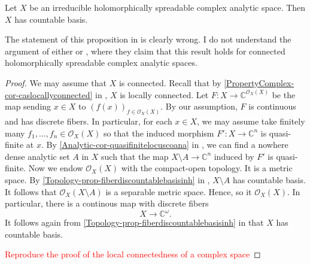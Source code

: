 \begin{proposition}
    Let $X$ be an irreducible holomorphically spreadable complex analytic space. Then $X$ has countable basis.
\end{proposition}
The statement of this proposition in \cite[Proposition~0.37]{Fis76} is clearly wrong. I do not understand the argument of either \cite{Jur59} or \cite{Gra55}, where they claim that this result holds for connected holomorphically spreadable complex analytic spaces.
\begin{proof}
    We may assume that $X$ is connected. Recall that by \cref{PropertyComplex-cor-caslocallyconnected} in , $X$ is locally connected.
    Let $F:X\rightarrow \mathbb{C}^{\mathcal{O}_X(X)}$ be the map sending $x\in X$ to $(f(x))_{f\in \mathcal{O}_X(X)}$. By our assumption, $F$ is continuous and has discrete fibers.     
    In particular, for each $x\in X$, we may assume take finitely many $f_1,\ldots,f_n\in \mathcal{O}_X(X)$ so that the induced morphism $F':X\rightarrow \mathbb{C}^n$ is quasi-finite at $x$. By \cref{Analytic-cor-quasifinitelocuscoana} in , we can find a nowhere dense analytic set $A$ in $X$ such that the map $X\setminus A\rightarrow \mathbb{C}^n$ induced by $F'$ is quasi-finite. Now we endow $\mathcal{O}_X(X)$ with the compact-open topology. It is a metric space. By \cref{Topology-prop-fiberdiscountablebasisinh} in , $X\setminus A$ has countable basis. It follows that $\mathcal{O}_X(X\setminus A)$ is a separable metric space. Hence, so it $\mathcal{O}_X(X)$. In particular, there is a continous map with discrete fibers
    \[
        X\rightarrow  \mathbb{C}^{\omega}.  
    \]
    It follows again from \cref{Topology-prop-fiberdiscountablebasisinh} in  that $X$ has countable basis.

    \textcolor{red}{Reproduce the proof of the local connectedness of a complex space}
\end{proof}

\iffalse
\begin{thm}[Grauert]
    Let $X$ be a holomorphically spreadable complex analytic space. Then there is $n\in \mathbb{N}$ a quasi-finite morphism $f:X\rightarrow \mathbb{C}^n$.
\end{thm}
\begin{proof}
    
\end{proof}
\fi

